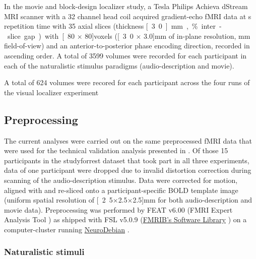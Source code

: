 In the movie and block-design localizer study, a \unit[3]{Tesla} Philips Achieva
dStream MRI scanner with a 32 channel head coil acquired gradient-echo fMRI data
at \unit[2]{s} repetition time with
35 axial slices (thickness \unit[3.0]{mm}, \unit[10]{\%} inter-slice gap) with
\unit[80 $\times$ 80]{voxels} (\unit[3.0 $\times$ 3.0]{mm} of in-plane
resolution, \unit[240]{mm} field-of-view) and an anterior-to-posterior phase
encoding direction, recorded in ascending order.
A total of 3599 volumes were recorded for each participant in each of the
naturalistic stimulus paradigms (audio-description and movie).

A total of 624 volumes were recored for each participant across the four runs of
the visual localizer experiment


\subsection{Preprocessing}


The current analyses were carried out on the same preprocessed fMRI data
\citep{hanke2016aligned} that were used for the technical validation analysis
presented in \citet{hanke2016simultaneous}.
Of those 15 participants in the studyforrest dataset that took part in all three
experiments, data of one participant were dropped due to invalid distortion
correction during scanning of the audio-description stimulus.
Data were corrected for motion, aligned with and re-sliced onto a
participant-specific BOLD template image \citep{sengupta2016extension} (uniform
spatial resolution of \unit[2.5$\times$2.5$\times$2.5]{mm} for both
audio-description and movie data).
Preprocessing was performed by FEAT v6.00 (FMRI Expert Analysis Tool
\citep{woolrich2001autocorr}) as shipped with FSL v5.0.9
(\href{https://www.fmrib.ox.ac.uk/fsl}{FMRIB's Software Library}
\citep{smith2004fsl}) on a computer-cluster running
\href{http://neuro.debian.net}{NeuroDebian} \citep{halchenko2012open}.



\subsubsection{Naturalistic stimuli}



